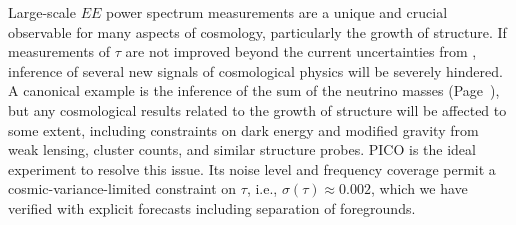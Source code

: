 \documentclass[PICOReport.tex]{subfiles}
\begin{document}
Large-scale $EE$ power spectrum measurements are a unique and crucial observable for many aspects of cosmology, particularly the growth of structure.  If measurements of $\tau$ are not improved beyond the current uncertainties from \planck , inference of several new signals of cosmological physics will be severely hindered.  A canonical example is the inference of the sum of the neutrino masses (Page~\pageref{neutrino_fundamental}), but any cosmological results related to the growth of structure will be affected to some extent, including constraints on dark energy and modified gravity from weak lensing, cluster counts, and similar structure probes.  PICO is the ideal experiment to resolve this issue.  Its noise level and frequency coverage permit a cosmic-variance-limited constraint on $\tau$, i.e., $\sigma(\tau) \approx 0.002$, which we have verified with explicit forecasts including separation of foregrounds. 
\end{document}
